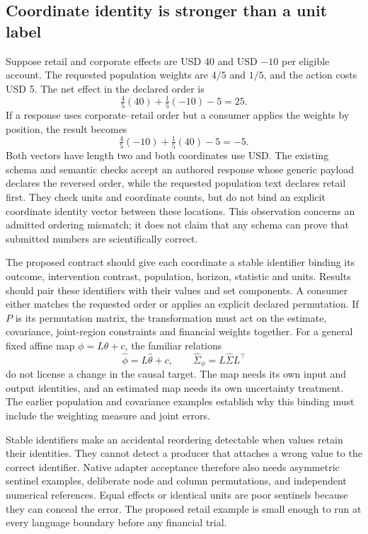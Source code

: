 \subsection{Coordinate identity is stronger than a unit label}

Suppose retail and corporate effects are USD 40 and USD \(-10\) per eligible
account. The requested population weights are \(4/5\) and \(1/5\), and the
action costs USD 5. The net effect in the declared order is
\[
 \tfrac45(40)+\tfrac15(-10)-5=25.
\]
If a response uses corporate--retail order but a consumer applies the weights
by position, the result becomes
\[
 \tfrac45(-10)+\tfrac15(40)-5=-5.
\]
Both vectors have length two and both coordinates use USD. The existing schema
and semantic checks accept an authored response whose generic payload declares
the reversed order, while the requested population text declares retail first.
They check units and coordinate counts, but do not bind an explicit coordinate
identity vector between these locations. This observation concerns an admitted
ordering mismatch; it does not claim that any schema can prove that submitted
numbers are scientifically correct.
\citep{exec16_topology_runtime,exec16_topology_exact}

The proposed contract should give each coordinate a stable identifier binding
its outcome, intervention contrast, population, horizon, statistic and units.
Results should pair these identifiers with their values and set components.
A consumer either matches the requested order or applies an explicit declared
permutation. If \(P\) is its permutation matrix, the transformation must act on
the estimate, covariance, joint-region constraints and financial weights
together. For a general fixed affine map \(\phi=L\theta+c\), the familiar
relations
\[
 \widehat\phi=L\widehat\theta+c,\qquad
 \widehat\Sigma_\phi=L\widehat\Sigma L^\top
\]
do not license a change in the causal target. The map needs its own input and
output identities, and an estimated map needs its own uncertainty treatment.
The earlier population and covariance examples establish why this binding
must include the weighting measure and joint errors.
\citep{exec13_interchange_examples}

Stable identifiers make an accidental reordering detectable when values retain
their identities. They cannot detect a producer that attaches a wrong value to
the correct identifier. Native adapter acceptance therefore also needs
asymmetric sentinel examples, deliberate node and column permutations, and
independent numerical references. Equal effects or identical units are poor
sentinels because they can conceal the error. The proposed retail example is
small enough to run at every language boundary before any financial trial.

